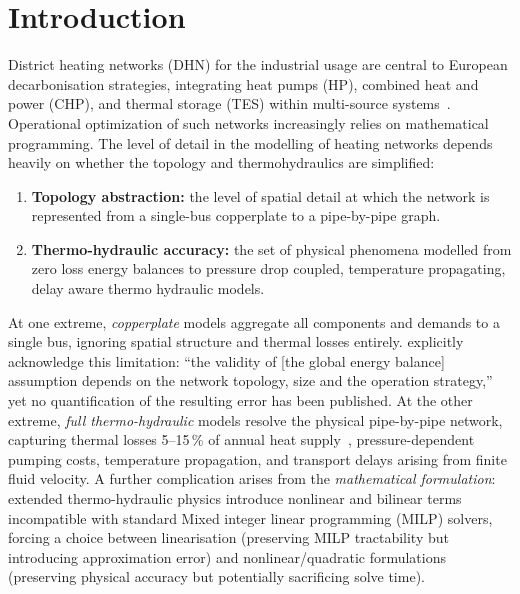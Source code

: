 \documentclass[a4paper,fleqn]{cas-dc}
\begin{document}
\section{Introduction}
\label{sec:introduction}


District heating networks (DHN) for the industrial usage are central to European decarbonisation
strategies, integrating heat pumps (HP), combined heat and power (CHP), and thermal storage (TES) within
multi-source systems~\citep{Lund2014_4GDH,Werner2017}.
Operational optimization of such networks increasingly relies on
mathematical programming. The level of detail in the modelling of heating networks depends heavily on whether the topology and thermohydraulics are simplified:

%
\begin{enumerate}[nosep]
  \item \textbf{Topology abstraction:} the level of spatial detail
        at which the network is represented from a single-bus
        copperplate to a pipe-by-pipe graph.
  \item \textbf{Thermo-hydraulic accuracy:} the set of physical phenomena
        modelled from zero loss energy balances to
        pressure drop coupled, temperature propagating, delay aware
        thermo hydraulic models.
\end{enumerate}

At one extreme, \emph{copperplate} models aggregate all components
and demands to a single bus, ignoring spatial structure and thermal
losses entirely. \citet{Wirtz2020} explicitly acknowledge
this limitation: ``the validity of [the global energy balance]
assumption depends on the network topology, size and the operation
strategy,'' yet no quantification of the resulting error has been
published. At the other extreme, \emph{full thermo-hydraulic} models
resolve the physical pipe-by-pipe network, capturing thermal losses
 5--15\,\% of annual heat
supply~\citep{Frederiksen2013,Talebi2016}, pressure-dependent
pumping costs, temperature propagation, and transport delays arising
from finite fluid velocity. A further complication arises from the
\emph{mathematical formulation}: extended thermo-hydraulic physics
introduce nonlinear and bilinear terms incompatible with standard
Mixed integer linear programming (MILP) solvers, forcing a choice between linearisation (preserving
MILP tractability but introducing approximation error) and
nonlinear/quadratic formulations (preserving physical accuracy but
potentially sacrificing solve time).
\end{document}
